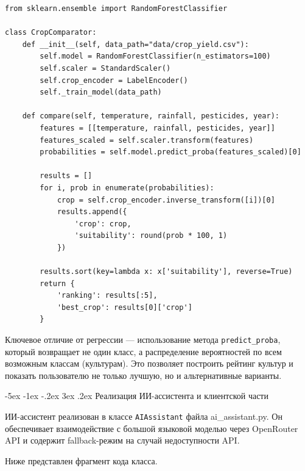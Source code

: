 \documentclass[14pt, a4paper]{extarticle}
\makeatletter
\renewcommand\subsection{\@startsection {subsection}{2}{\z@}%
    {-5ex \@plus -1ex \@minus -.2ex}%
    {3ex \@plus.2ex}%
    {\centering\large\bfseries}}
\makeatother
\begin{document}
\begin{verbatim}
from sklearn.ensemble import RandomForestClassifier

class CropComparator:
    def __init__(self, data_path="data/crop_yield.csv"):
        self.model = RandomForestClassifier(n_estimators=100)
        self.scaler = StandardScaler()
        self.crop_encoder = LabelEncoder()
        self._train_model(data_path)
    
    def compare(self, temperature, rainfall, pesticides, year):
        features = [[temperature, rainfall, pesticides, year]]
        features_scaled = self.scaler.transform(features)
        probabilities = self.model.predict_proba(features_scaled)[0]
        
        results = []
        for i, prob in enumerate(probabilities):
            crop = self.crop_encoder.inverse_transform([i])[0]
            results.append({
                'crop': crop,
                'suitability': round(prob * 100, 1)
            })
        
        results.sort(key=lambda x: x['suitability'], reverse=True)
        return {
            'ranking': results[:5],
            'best_crop': results[0]['crop']
        }
\end{verbatim}

    Ключевое отличие от регрессии — использование метода \texttt{predict\_proba}, который возвращает не один класс, а распределение вероятностей по всем возможным классам (культурам). Это позволяет построить рейтинг культур и показать пользователю не только лучшую, но и альтернативные варианты.

\subsection{Реализация ИИ-ассистента и клиентской части}

    ИИ-ассистент реализован в классе \texttt{AIAssistant} файла ai\_assistant.py. Он обеспечивает взаимодействие с большой языковой моделью через OpenRouter API \cite{openrouter} и содержит fallback-режим на случай недоступности API.

    Ниже представлен фрагмент кода класса.
\end{document}
